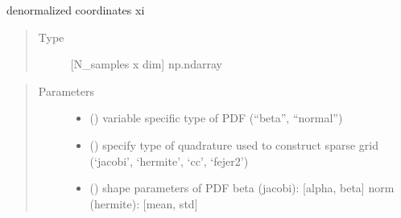 \documentclass[letterpaper,10pt,english,openany,oneside]{sphinxmanual}
\begin{document}
\begin{fulllineitems}
\begin{fulllineitems}
\begin{quote}
\begin{description}
\end{description}\end{quote}

\end{fulllineitems}


\begin{fulllineitems}
\label{\detokenize{pygpc:pygpc.grid.TensorGrid.coords}}
denormalized coordinates xi
\begin{quote}\begin{description}
\item[{Type}] \leavevmode
{[}N\_samples x dim{]} np.ndarray

\end{description}\end{quote}

\end{fulllineitems}

\begin{quote}\begin{description}
\item[{Parameters}] \leavevmode\begin{itemize}
\item {} 
 (\sphinxstyleliteralemphasis{\sphinxupquote{{[}}}\sphinxstyleliteralemphasis{\sphinxupquote{{]} }}) \textendash{} variable specific type of PDF (“beta”, “normal”)

\item {} 
 (\sphinxstyleliteralemphasis{\sphinxupquote{{[}}}\sphinxstyleliteralemphasis{\sphinxupquote{{]} }}) \textendash{} specify type of quadrature used to construct sparse grid (‘jacobi’, ‘hermite’, ‘cc’, ‘fejer2’)

\item {} 
 (\sphinxstyleliteralemphasis{\sphinxupquote{{[}}}\sphinxstyleliteralemphasis{\sphinxupquote{{]} }}) \textendash{} shape parameters of PDF
beta (jacobi):  {[}alpha, beta{]}
norm (hermite): {[}mean, std{]}


\end{itemize}
\end{description}
\end{quote}
\end{fulllineitems}
\end{document}
